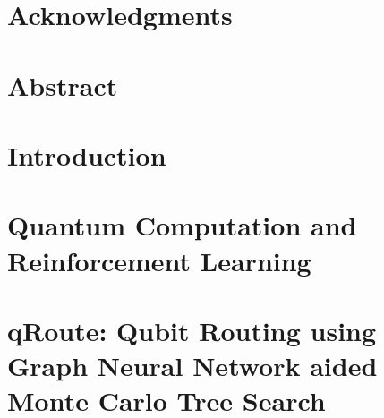 \documentclass[11pt]{book}
\renewcommand{\baselinestretch}{1.2}
\begin{document}



\newpage
\thispagestyle{empty}
\renewcommand{\thesisdedication}{{\large Copyright \copyright~~Animesh Sinha, 2022\\}{\large All Rights Reserved\\}}
\thesisdedicationpage



\newpage
\thispagestyle{empty}
\renewcommand{\thesisdedication}{\large Learning to Compute for making Compute that Learns}
\thesisdedicationpage

\mastersthesis
\renewcommand{\baselinestretch}{1.5}

\chapter*{Acknowledgments}
\label{ch:ack}


\chapter*{Abstract}
\label{ch:abstract}


\tableofcontents
\listoffigures
\listoftables


\chapter{Introduction}
\label{ch:intro}



\chapter{Quantum Computation and Reinforcement Learning}
\label{ch:background}



\chapter{qRoute: Qubit Routing using Graph Neural Network aided Monte Carlo Tree Search}
\label{ch:qroute}

\end{document}
